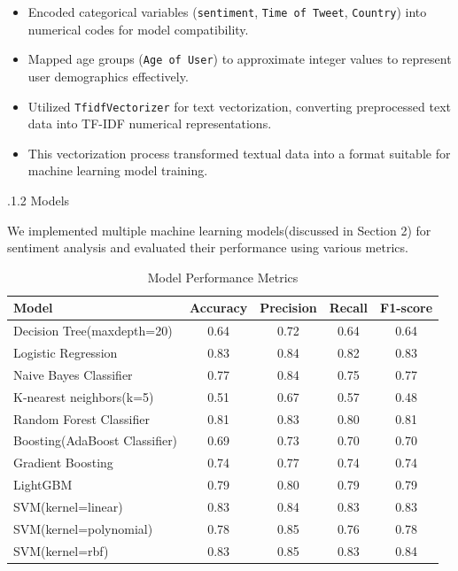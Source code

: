\documentclass[a4paper]{article}
\theoremstyle{plain}
\theoremstyle{definition}
\begin{document}
\begin{itemize}
    \item Encoded categorical variables (\texttt{sentiment}, \texttt{Time of Tweet}, \texttt{Country}) into numerical codes for model compatibility.
    \item Mapped age groups (\texttt{Age of User}) to approximate integer values to represent user demographics effectively.
\end{itemize}

\begin{itemize}
    \item Utilized \texttt{TfidfVectorizer} for text vectorization, converting preprocessed text data into TF-IDF numerical representations.
    \item This vectorization process transformed textual data into a format suitable for machine learning model training.
\end{itemize}.1.2 Models \newline

We implemented multiple machine learning models(discussed in Section 2) for sentiment analysis and evaluated their performance using various metrics.
\begin{table}[htbp]
    \centering
    \caption{Model Performance Metrics}
    \label{tab:model_metrics}
    \begin{tabular}{|l|c|c|c|c|}
        \hline
        \textbf{Model} & \textbf{Accuracy} & \textbf{Precision} & \textbf{Recall} & \textbf{F1-score} \\
        \hline
        Decision Tree(maxdepth=20) & 0.64 & 0.72 & 0.64 & 0.64 \\
        Logistic Regression & 0.83 & 0.84 & 0.82 & 0.83 \\
        Naive Bayes Classifier & 0.77 & 0.84 & 0.75 & 0.77 \\
        K-nearest neighbors(k=5) & 0.51 & 0.67 & 0.57 & 0.48 \\
        Random Forest Classifier & 0.81 & 0.83 & 0.80 & 0.81 \\
        Boosting(AdaBoost Classifier) & 0.69 & 0.73 & 0.70 & 0.70 \\
        Gradient Boosting & 0.74& 0.77 & 0.74 & 0.74 \\
        LightGBM & 0.79 & 0.80 & 0.79 & 0.79 \\
        SVM(kernel=linear) & 0.83 & 0.84 & 0.83 & 0.83 \\
        SVM(kernel=polynomial) & 0.78 & 0.85 & 0.76 & 0.78\\
        SVM(kernel=rbf) & 0.83 & 0.85 & 0.83 & 0.84 \\
        \hline
    \end{tabular}
\end{table}
\end{document}
